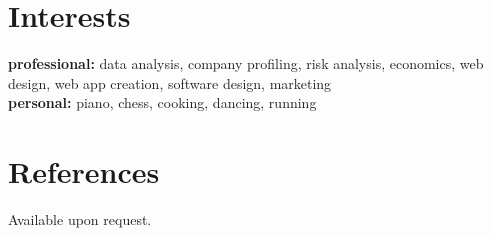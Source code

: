 \documentclass[hidelinks]{kkurucz-cv}
\begin{document}

\section{Interests}
\textbf{professional:} data analysis, company profiling, risk analysis, economics, web design, web app creation, software design, marketing
\\
\textbf{personal:} piano, chess, cooking, dancing, running
\\
\section{References}
{Available upon request.}
\end{document}
